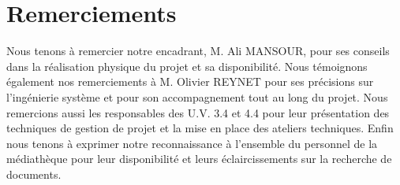 \section*{Remerciements}

Nous tenons à remercier notre encadrant, M. Ali MANSOUR, pour ses conseils dans la réalisation physique du projet et sa disponibilité.
\bigbreak
Nous témoignons également nos remerciements à M. Olivier REYNET pour ses précisions sur l’ingénierie système et pour son accompagnement tout au long du projet.
\bigbreak
Nous remercions aussi les responsables des U.V. 3.4 et 4.4 pour leur présentation des techniques de gestion de projet et la mise en place des ateliers techniques.
\bigbreak
Enfin nous tenons à exprimer notre reconnaissance à l’ensemble du personnel de la médiathèque pour leur disponibilité et leurs éclaircissements sur la recherche de documents.
